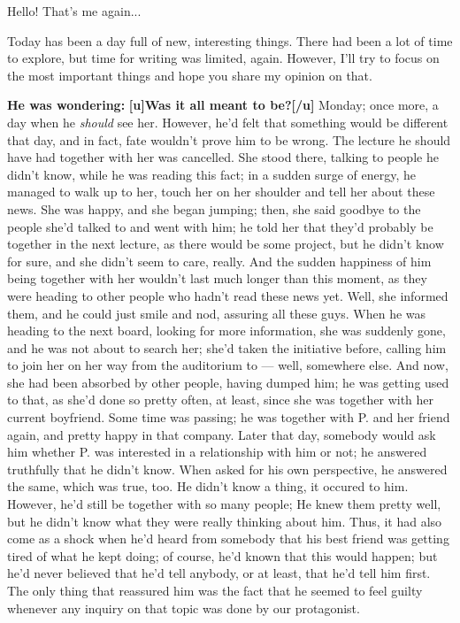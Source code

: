 Hello! That's me again...

Today has been a day full of new, interesting things. There had been a lot of time to explore, but time for writing was limited, again. However, I'll try to focus on the most important things and hope you share my opinion on that. 

\textbf{He was wondering:}
\textbf{[u]Was it all meant to be?[/u]}
Monday; once more, a day when he \emph{should} see her. However, he'd felt that something would be different that day, and in fact, fate wouldn't prove him to be wrong. 
The lecture he should have had together with her was cancelled. 
She stood there, talking to people he didn't know, while he was reading this fact; in a sudden surge of energy, he managed to walk up to her, touch her on her shoulder and tell her about these news. 
She was happy, and she began jumping; then, she said goodbye to the people she'd talked to and went with him; he told her that they'd probably be together in the next lecture, as there would be some project, but he didn't know for sure, and she didn't seem to care, really. 
And the sudden happiness of him being together with her wouldn't last much longer than this moment, as they were heading to other people who hadn't read these news yet. Well, she informed them, and he could just smile and nod, assuring all these guys. When he was heading to the next board, looking for more information, she was suddenly gone, and he was not about to search her; she'd taken the initiative before, calling him to join her on her way from the auditorium to --- well, somewhere else. And now, she had been absorbed by other people, having dumped him; he was getting used to that, as she'd done so pretty often, at least, since she was together with her current boyfriend. 
Some time was passing; he was together with P. and her friend again, and pretty happy in that company. Later that day, somebody would ask him whether P. was interested in a relationship with him or not; he answered truthfully that he didn't know. When asked for his own perspective, he answered the same, which was true, too. 
He didn't know a thing, it occured to him. However, he'd still be together with so many people; He knew them pretty well, but he didn't know what they were really thinking about him. Thus, it had also come as a shock when he'd heard from somebody that his best friend was getting tired of what he kept doing; of course, he'd known that this would happen; but he'd never believed that he'd tell anybody, or at least, that he'd tell him first. The only thing that reassured him was the fact that he seemed to feel guilty whenever any inquiry on that topic was done by our protagonist. 
